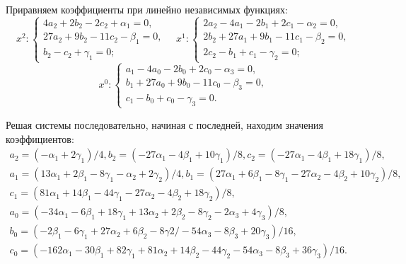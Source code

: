 \documentclass[11pt]{article}
\begin{document}
{\smallskip
Приравняем коэффициенты при линейно независимых функциях:
$$x^2:
\begin{cases}
4a_2 + 2b_2 - 2c_2 + \alpha_1 = 0, \\
27a_2 + 9b_2 - 11c_2 - \beta_1 = 0, \\
b_2 - c_2 + \gamma_1 = 0;
\end{cases} \quad
x^1:
\begin{cases}
2a_2 - 4a_1 - 2b_1 + 2c_1 - \alpha_2 = 0, \\
2b_2 + 27a_1 + 9b_1 - 11c_1 - \beta_2 = 0, \\
2c_2 -b_1 + c_1 - \gamma_2 = 0;
\end{cases}
$$
$$x^0:
\begin{cases}
a_1 - 4a_0 - 2b_0 + 2c_0 - \alpha_3 = 0, \\
b_1 + 27a_0 + 9b_0 - 11c_0 - \beta_3 = 0, \\
c_1 - b_0 + c_0 - \gamma_3 = 0.
\end{cases}
$$

Решая системы последовательно, начиная с последней, находим значения коэффициентов:
\[
\begin{array}{ll}
a_2 = (-\alpha_1 + 2\gamma_1)/4, b_2 = (-27\alpha_1 - 4\beta_1 + 10\gamma_1)/8, c_2 = (-27\alpha_1 - 4\beta_1 + 18\gamma_1)/8, & \\[6pt]
a_1 = (13\alpha_1 + 2\beta_1 - 8\gamma_1  - \alpha_2 + 2\gamma_2)/4, b_1 = (27\alpha_1 + 6\beta_1 - 8\gamma_1 -27\alpha_2 - 4\beta_2 + 10\gamma_2)/8, & \\
c_1 = (81\alpha_1 + 14\beta_1 - 44\gamma_1 - 27\alpha_2 - 4\beta_2 + 18\gamma_2)/8, & \\[6pt]
a_0 = (-34\alpha_1 - 6\beta_1 + 18\gamma_1 + 13\alpha_2 + 2\beta_2 - 8\gamma_2 - 2\alpha_3 + 4\gamma_3)/8, & \\[3pt]
b_0 = (-2\beta_1 - 6\gamma_1 + 27\alpha_2 + 6\beta_2 - 8\gamma2/ - 54\alpha_3 - 8\beta_3 + 20\gamma_3)/16, & \\
c_0 = (-162\alpha_1 - 30\beta_1 + 82\gamma_1 + 81\alpha_2 + 14\beta_2 - 44\gamma_2 - 54\alpha_3 -8\beta_3 +36\gamma_3)/16. &
\end{array}
\]

}
\end{document}

